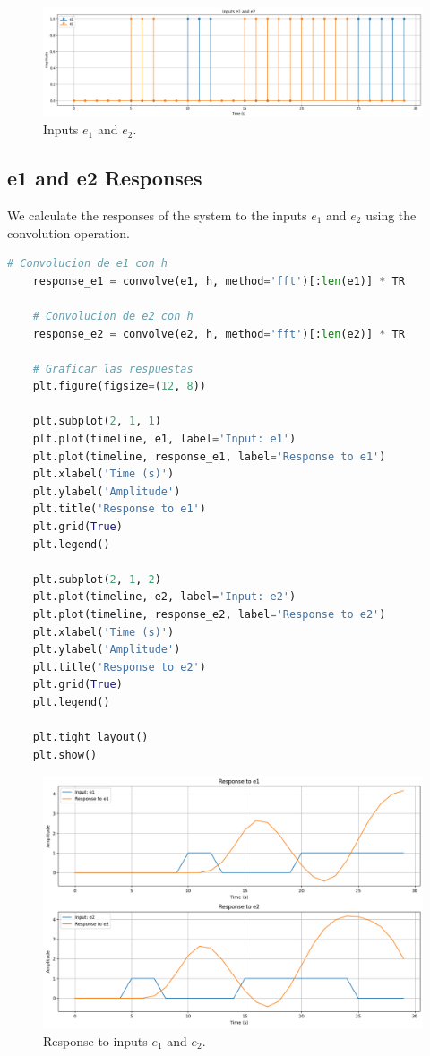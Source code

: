 \documentclass[10pt]{article}
\theoremstyle{definition}
\theoremstyle{remark}
\theoremstyle{definition}
\numberwithin{equation}{prob}
\begin{document}
\begin{figure}[H]
    \centering
    \includegraphics[width=0.8\linewidth]{./figures/Inputs e1 and e2.png}
    \caption{Inputs $e_1$ and $e_2$.}
\end{figure}

\subsection{e1 and e2 Responses}

We calculate the responses of the system to the inputs $e_1$ and $e_2$ using the convolution operation.

\begin{lstlisting}[language=Python]
    # Convolucion de e1 con h
    response_e1 = convolve(e1, h, method='fft')[:len(e1)] * TR
    
    # Convolucion de e2 con h
    response_e2 = convolve(e2, h, method='fft')[:len(e2)] * TR
    
    # Graficar las respuestas
    plt.figure(figsize=(12, 8))
    
    plt.subplot(2, 1, 1)
    plt.plot(timeline, e1, label='Input: e1')
    plt.plot(timeline, response_e1, label='Response to e1')
    plt.xlabel('Time (s)')
    plt.ylabel('Amplitude')
    plt.title('Response to e1')
    plt.grid(True)
    plt.legend()
    
    plt.subplot(2, 1, 2)
    plt.plot(timeline, e2, label='Input: e2')
    plt.plot(timeline, response_e2, label='Response to e2')
    plt.xlabel('Time (s)')
    plt.ylabel('Amplitude')
    plt.title('Response to e2')
    plt.grid(True)
    plt.legend()
    
    plt.tight_layout()
    plt.show()
\end{lstlisting}

\begin{figure}[H]
    \centering
    \includegraphics[width=0.8\linewidth]{./figures/Response Inputs e1 and e2.png}
    \caption{Response to inputs $e_1$ and $e_2$.}
\end{figure}
\end{document}
